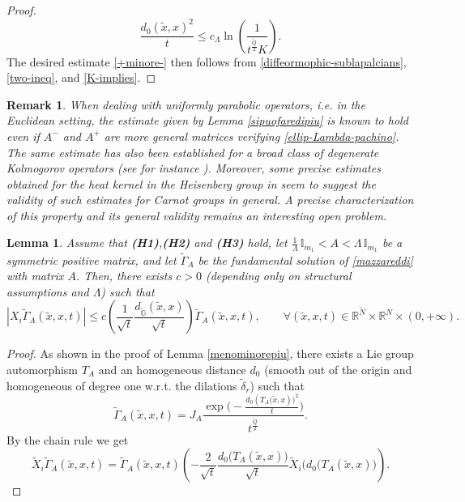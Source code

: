 \documentclass[11pt,a4paper]{article}
\newtheorem{lemma}[theorem]{\bf Lemma}
\newtheorem{remark}[theorem]{\bf Remark}
\numberwithin{equation}{section}
\def \rn {{\mathbb {R}}^{N}}
\def \rnm {{\mathbb {R}}^{\tilde N}}
\def \tt {\tilde}
\def \GG {{\mathbb{G}}}
\def \ti {\times}
\def \G {{\Gamma}}
\begin{document}
{{\begin{proof}
\begin{equation}
		\frac{ d_0 (\tt x,x)^2}{t}\leq c_\Lambda \ln \left(\frac{1}{t^{\frac{\tt Q}{2}}K}\right).
	\end{equation}
	The desired estimate \eqref{+minore-} then follows from \eqref{diffeormophic-sublapalcians}, \eqref{two-ineq}, and \eqref{K-implies}.
\end{proof}
\begin{remark}
	When dealing with uniformly parabolic operators, i.e. in the Euclidean setting, the estimate given by Lemma \ref{sipuofaredipiu} is known to hold even if $A^-$ and $A^+$ are more general matrices verifying \eqref{ellip-Lambda-pachino}. The same estimate has also been established for a broad class of degenerate Kolmogorov operators (see for instance \cite{polidoro-parametrix,rebucci24}). Moreover, some precise estimates obtained for the heat kernel in the Heisenberg group in \cite{lanconelli1,lanconelli2} seem to suggest the validity of such estimates for Carnot groups in general. A precise characterization of this property and its general validity remains an interesting open problem. 
\end{remark}
\begin{lemma}\label{derivatives-constant-operator}
	Assume that \textbf{(H1)},\textbf{(H2)} and \textbf{(H3)} hold, let $\frac{1}{\Lambda} \, \mathbb{I}_{m_1}< A < \Lambda \, \mathbb{I}_{m_1}$ be a symmetric positive matrix, and let $\tt\G_A$ be the fundamental solution of \eqref{mazzareddi} with matrix $A$. Then, there exists $c>0$ (depending only on structural assumptions and $\Lambda$) such that
	\begin{equation}\label{pachino}
		|X_i \tt\G_A (\tt x,x,t)|\leq c \left(\frac{1}{\sqrt{t}} \frac{d_{\tt \GG}(\tt x,x)}{\sqrt{t}}\right)\tt \G_A(\tt x,x,t),\qquad \forall (\tt x, x,t) \in \rnm\ti \rn\ti(0,+\infty).
	\end{equation}
\end{lemma}
\begin{proof}
	As shown in the proof of Lemma \ref{menominorepiu}, there exists a Lie group automorphism $T_A$ and an homogeneous distance ${d_0}$ (smooth out of the origin and homogeneous of degree one w.r.t. the dilations $\widetilde{\delta}_r$) such that
	\begin{equation}
		\tt\G_{A}(\tilde x,x,t)=J_A\frac{\exp\Bigg(-\frac{ d_0 (T_{A}\big(\tt x,x)\big)^2}{t}\Bigg)}{t^{\frac{\tilde{Q}}{2}}}.
	\end{equation}
	By the chain rule we get
	\begin{equation}\label{mirabella-imbaccari}
		\tt X_i \tt\G_{A}(\tilde x,x,t)= \tt\G_{A}(\tilde x,x,t)\left(-\frac{2}{\sqrt{t}} \frac{ d_0 \big(T_{A}(\tt x,x)\big) }{\sqrt{t}} \tt X_i  \Big(d_0 \big(T_{A}(\tt x,x)\Big) \right).

\end{equation}
\end{proof}}}
\end{document}
